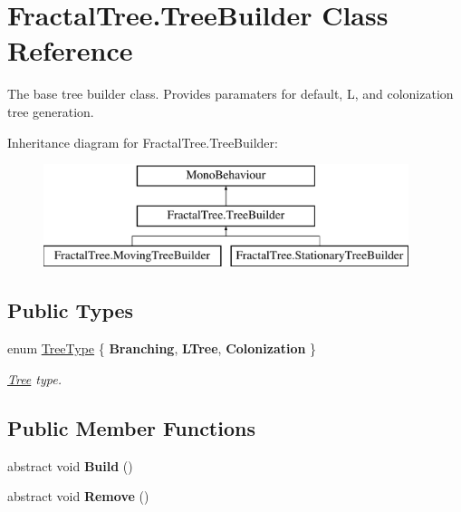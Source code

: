 \hypertarget{class_fractal_tree_1_1_tree_builder}{}\section{Fractal\+Tree.\+Tree\+Builder Class Reference}
\label{class_fractal_tree_1_1_tree_builder}


The base tree builder class. Provides paramaters for default, L, and colonization tree generation.  


Inheritance diagram for Fractal\+Tree.\+Tree\+Builder\+:\begin{figure}[H]
\begin{center}
\leavevmode
\includegraphics[height=3.000000cm]{class_fractal_tree_1_1_tree_builder}
\end{center}
\end{figure}
\subsection*{Public Types}
\begin{DoxyCompactItemize}
\item 
enum \hyperlink{class_fractal_tree_1_1_tree_builder_a955d67cfa976440cc427e591be74f979}{Tree\+Type} \{ {\bfseries Branching}, 
{\bfseries L\+Tree}, 
{\bfseries Colonization}
 \}\begin{DoxyCompactList}\small\item\em \hyperlink{interface_fractal_tree_1_1_tree}{Tree} type. \end{DoxyCompactList}
\end{DoxyCompactItemize}
\subsection*{Public Member Functions}
\begin{DoxyCompactItemize}
\item 
\mbox{\label{class_fractal_tree_1_1_tree_builder_a88adcd333ec7886c37d9810eab7fb8f0}} 
abstract void {\bfseries Build} ()
\item 
\mbox{\label{class_fractal_tree_1_1_tree_builder_a78e204c24a9e5e49734ecaa87d395e53}} 
abstract void {\bfseries Remove} ()
\end{DoxyCompactItemize}
